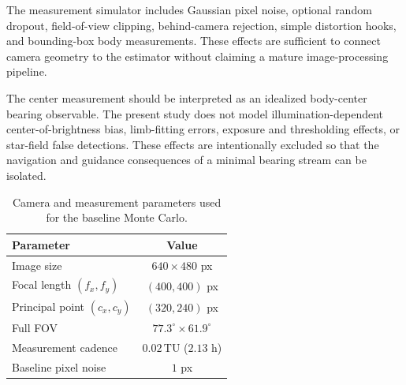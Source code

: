 \documentclass[10pt,twocolumn]{article}
\newcommand{\TU}{\mathrm{TU}}
\begin{document}
The measurement simulator includes Gaussian pixel noise, optional random dropout, field-of-view clipping, behind-camera rejection, simple distortion hooks, and bounding-box body measurements.  These effects are sufficient to connect camera geometry to the estimator without claiming a mature image-processing pipeline.

The center measurement should be interpreted as an idealized body-center bearing observable.  The present study does not model illumination-dependent center-of-brightness bias, limb-fitting errors, exposure and thresholding effects, or star-field false detections.  These effects are intentionally excluded so that the navigation and guidance consequences of a minimal bearing stream can be isolated.

\begin{table}[t]
\centering
\caption{Camera and measurement parameters used for the baseline Monte Carlo.}
\label{tab:camera}
\footnotesize
\begin{tabular}{@{}lc@{}}
\toprule
Parameter & Value \\
\midrule
Image size & $640\times480$ px \\
Focal length $(f_x,f_y)$ & $(400,400)$ px \\
Principal point $(c_x,c_y)$ & $(320,240)$ px \\
Full FOV & $77.3^\circ\times61.9^\circ$ \\
Measurement cadence & $0.02\,\TU$ ($2.13$ h) \\
Baseline pixel noise & $1$ px \\
\bottomrule
\end{tabular}
\end{table}
\end{document}
